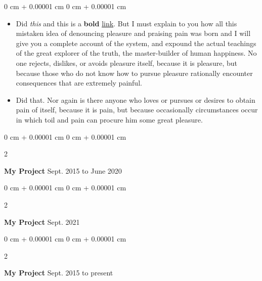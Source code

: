 \documentclass[10pt, letterpaper]{article}
\newenvironment{highlights}{
    \begin{itemize}[
        topsep=0.10 cm,
        parsep=0.10 cm,
        partopsep=0pt,
        itemsep=0pt,
        leftmargin=0 cm + 10pt
    ]
}{
    \end{itemize}
} %
\newenvironment{onecolentry}{
    \begin{adjustwidth}{
        0 cm + 0.00001 cm
    }{
        0 cm + 0.00001 cm
    }
}{
    \end{adjustwidth}
} %
\newenvironment{twocolentry}[2][]{
    \onecolentry
    \def\secondColumn{#2}
    \setcolumnwidth{\fill, 4.5 cm}
    \begin{paracol}{2}
}{
    \switchcolumn \raggedleft \secondColumn
    \end{paracol}
    \endonecolentry
} %
\begin{document}
        \vspace{0.10 cm}
        \begin{onecolentry}
            \begin{highlights}
                \item Did \textit{this} and this is a \textbf{bold} \href{https://example.com}{link}. But I must explain to you how all this mistaken idea of denouncing pleasure and praising pain was born and I will give you a complete account of the system, and expound the actual teachings of the great explorer of the truth, the master-builder of human happiness. No one rejects, dislikes, or avoids pleasure itself, because it is pleasure, but because those who do not know how to pursue pleasure rationally encounter consequences that are extremely painful.
                \item Did that. Nor again is there anyone who loves or pursues or desires to obtain pain of itself, because it is pain, but because occasionally circumstances occur in which toil and pain can procure him some great pleasure.
            \end{highlights}
        \end{onecolentry}


        \vspace{0.2 cm}

        \begin{twocolentry}{
            Sept. 2015 to June 2020
        }
            \textbf{My Project}\end{twocolentry}



        \vspace{0.2 cm}

        \begin{twocolentry}{
            Sept. 2021
        }
            \textbf{My Project}\end{twocolentry}



        \vspace{0.2 cm}

        \begin{twocolentry}{
            Sept. 2015 to present
        }
            \textbf{My Project}\end{twocolentry}
\end{document}
